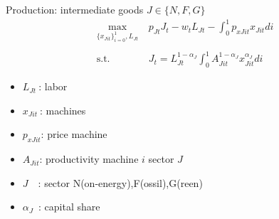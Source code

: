 \documentclass[11pt,aspectratio=169]{beamer}
\begin{document}
\begin{frame}{Production: intermediate goods $J\in \{N,F,G\}$ }
	\vspace{0mm}
	\begin{align*}
		\underset{\{x_{Jit}\}_{i=0}^1, L_{Jt}}{\max}\ & p_{Jt}J_t-w_{t}L_{Jt}-\int_{0}^{1}p_{xJit}x_{Jit}di \\ \ \\
		\text{s.t.}\ & J_{t}=L_{Jt}^{1-\alpha_J}\int_{0}^{1}A^{1-\alpha_J}_{Jit}x_{Jit}^{\alpha_J}di
	\end{align*}
	
	\small
	\vspace{10mm}
	\hspace{-4mm}
	\begin{minipage}[t!]{0.3\textwidth}
		\vspace{0mm}
		\begin{itemize}	
			\item[]$L_{Jt}\ $: labor 
			\vspace{-2mm}	
			\item[]$x_{Jit}\ $: machines 
			\vspace{-2mm}	
			\item[]$p_{xJit}$: price machine 
		\end{itemize}
	\end{minipage}
	\begin{minipage}[t!]{0.5\textwidth}
		\vspace{0mm}
		\begin{itemize}
			\item[] $A_{Jit}$: productivity machine $i$ sector $J$ \vspace{-2mm}
			\item[] $J$\ \  : sector N(on-energy),F(ossil),G(reen)
			\vspace{-2mm}	
			\item[] $\alpha_J$\ : capital share 
		\end{itemize}
	\end{minipage}
\end{frame}
\end{document}
